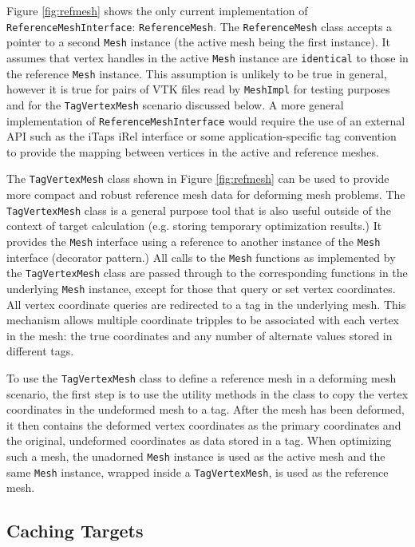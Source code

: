 \documentclass{article}
\begin{document}
Figure \ref{fig:refmesh} shows the only current implementation of \texttt{ReferenceMeshInterface}: \texttt{ReferenceMesh}.  The \texttt{ReferenceMesh} class accepts a pointer to a second \texttt{Mesh} instance (the active mesh being the first instance).  It assumes that vertex handles in the active \texttt{Mesh} instance are \texttt{identical} to those in the reference \texttt{Mesh} instance.  This assumption is unlikely to be true in general, however it is true for pairs of VTK files read by \texttt{MeshImpl} for testing purposes and for the \texttt{TagVertexMesh} scenario discussed below.  A more general implementation of \texttt{ReferenceMeshInterface} would require the use of an external API such as the iTaps iRel interface or some application-specific tag convention to provide the mapping between vertices in the active and reference meshes.

The \texttt{TagVertexMesh} class shown in Figure \ref{fig:refmesh} can be used to provide more compact and robust reference mesh data for deforming mesh problems.  The \texttt{TagVertexMesh} class is a general purpose tool that is also useful outside of the context of target calculation (e.g. storing temporary optimization results.)  It provides the \texttt{Mesh} interface using a reference to another instance of the \texttt{Mesh} interface (decorator pattern.)  All calls to the \texttt{Mesh} functions as implemented by the \texttt{TagVertexMesh} class are passed through to the corresponding functions in the underlying \texttt{Mesh} instance, except for those that query or set vertex coordinates.  All vertex coordinate queries are redirected to a tag in the underlying mesh.  This mechanism allows multiple coordinate tripples to be associated with each vertex in the mesh: the true coordinates and any number of alternate values stored in different tags.

To use the \texttt{TagVertexMesh} class to define a reference mesh in a deforming mesh scenario, the first step is to use the utility methods in the class to copy the vertex coordinates in the undeformed mesh to a tag.  After the mesh has been deformed, it then contains the deformed vertex coordinates as the primary coordinates and the original, undeformed coordinates as data stored in a tag.  When optimizing such a mesh, the unadorned \texttt{Mesh} instance is used as the active mesh and the same \texttt{Mesh} instance, wrapped inside a \texttt{TagVertexMesh}, is used as the reference mesh.

\subsection{Caching Targets}
\end{document}
